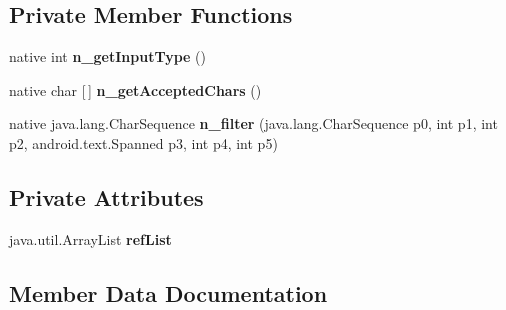 \subsection*{Private Member Functions}
\begin{DoxyCompactItemize}
\item 
\mbox{\label{classmd5b60ffeb829f638581ab2bb9b1a7f4f3f_1_1LocalizedDigitsKeyListener_a8db254b30f59bb9071beef3362d9853c}} 
native int {\bfseries n\+\_\+get\+Input\+Type} ()
\item 
\mbox{\label{classmd5b60ffeb829f638581ab2bb9b1a7f4f3f_1_1LocalizedDigitsKeyListener_a447e661b781c672ee3f0bac3c76448af}} 
native char \mbox{[}$\,$\mbox{]} {\bfseries n\+\_\+get\+Accepted\+Chars} ()
\item 
\mbox{\label{classmd5b60ffeb829f638581ab2bb9b1a7f4f3f_1_1LocalizedDigitsKeyListener_a7d8fd81af59fcfb834b8732fdbe30352}} 
native java.\+lang.\+Char\+Sequence {\bfseries n\+\_\+filter} (java.\+lang.\+Char\+Sequence p0, int p1, int p2, android.\+text.\+Spanned p3, int p4, int p5)
\end{DoxyCompactItemize}
\subsection*{Private Attributes}
\begin{DoxyCompactItemize}
\item 
\mbox{\label{classmd5b60ffeb829f638581ab2bb9b1a7f4f3f_1_1LocalizedDigitsKeyListener_ac8f791f7f9e40c12bcd21516e34e300d}} 
java.\+util.\+Array\+List {\bfseries ref\+List}
\end{DoxyCompactItemize}


\subsection{Member Data Documentation}
\mbox{\label{classmd5b60ffeb829f638581ab2bb9b1a7f4f3f_1_1LocalizedDigitsKeyListener_ac9b095fc4313cfd1f41cf5978338382c}} 

